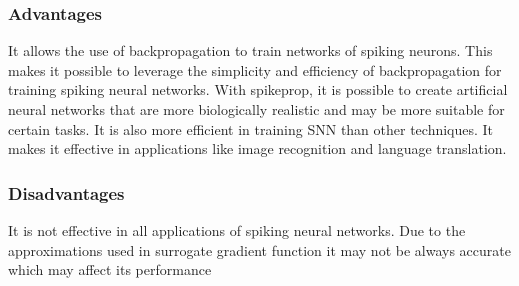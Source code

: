 \subsubsection{Advantages}
It allows the use of backpropagation to train networks of spiking neurons. This
makes it possible to leverage the simplicity and efficiency of backpropagation
for training spiking neural networks. With spikeprop, it is possible to create
artificial neural networks that are more biologically realistic and may be more
suitable for certain tasks. It is also more efficient in training SNN than
other techniques. It makes it effective in applications like image recognition
and language translation.
\subsubsection{Disadvantages}
It is not effective in all applications of spiking neural networks. Due to the
approximations used in surrogate gradient function it may not be always
accurate which may affect its performance